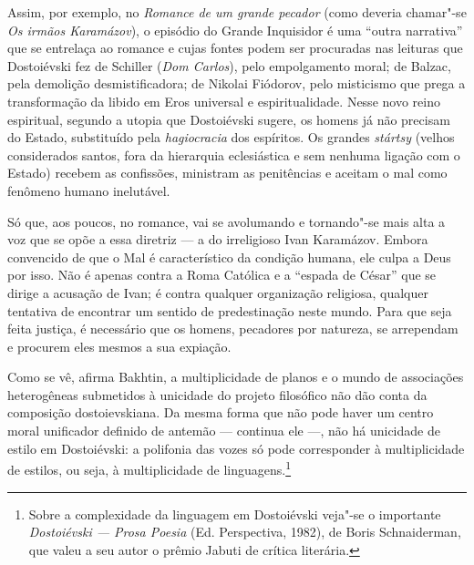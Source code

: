 Assim, por exemplo, no \emph{Romance de um grande pecador} (como deveria
chamar"-se \emph{Os irmãos Karamázov}), o episódio do Grande
Inquisidor é uma ``outra narrativa'' que se entrelaça ao romance e cujas
fontes podem ser procuradas nas leituras que Dostoiévski fez de Schiller (\emph{Dom Carlos}), pelo empolgamento moral; de Balzac, pela
demolição desmistificadora; de Nikolai Fiódorov, pelo misticismo que
prega a transformação da libido em Eros universal e espiritualidade.
Nesse novo reino espiritual, segundo a utopia que Dostoiévski sugere, os
homens já não precisam do Estado, substituído pela \emph{hagiocracia}
dos espíritos. Os grandes \emph{stártsy} (velhos considerados santos,
fora da hierarquia eclesiástica e sem nenhuma ligação com o Estado)
recebem as confissões, ministram as penitências e aceitam o mal como
fenômeno humano inelutável.

Só que, aos poucos, no romance, vai se avolu­mando e tornando"-se mais
alta a voz que se opõe a essa diretriz --- a do irreligioso Ivan
Karamázov. Embora convencido de que o Mal é característico da condição
humana, ele culpa a Deus por isso. Não é apenas contra a Roma Católica e
a ``espada de César'' que se dirige a acusação de Ivan; é contra
qualquer organização religiosa, qualquer tentativa de encontrar um
sentido de predestinação neste mundo. Para que seja feita justiça, é
necessário que os homens, pecadores por natureza, se arrependam e
procu­rem eles mesmos a sua expiação.

Como se vê, afirma Bakhtin, a multiplicidade de planos e o mundo de
associações heterogêneas submetidos à unicidade do projeto filosófico
não dão conta da composição dostoievskiana. Da mesma forma que não pode
haver um centro moral unificador definido de antemão --- continua ele
---, não há unicidade de estilo em Dostoiévski: a polifonia das vozes só
pode corresponder à multiplicidade de estilos, ou seja, à multiplicidade
de linguagens.\footnote{Sobre a complexidade da linguagem em Dostoiévski
veja"-se o importante \emph{Dostoiévski --- Prosa Poesia} (Ed. Perspectiva, 1982), de Boris Schnaiderman, que valeu a seu autor o prêmio Jabuti de crítica literária.}

